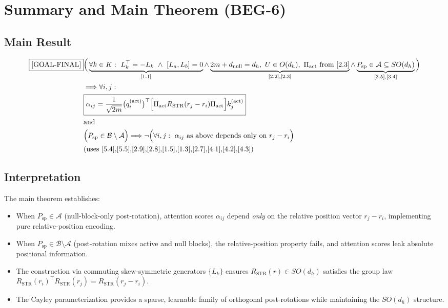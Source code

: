 \documentclass[11pt]{article}
\begin{document}
\section{Summary and Main Theorem (BEG-6)}

\subsection{Main Result}

\begin{align}
\boxed{\text{[GOAL-FINAL]}}
&\Big(
\underbrace{
\forall k\in K:\ L_k^\top=-L_k\ \wedge\ [L_a,L_b]=0
}_{[1.1]}
\wedge
\underbrace{
2m+d_{\mathrm{null}}=d_h,\ U\in O(d_h),\ \Pi_{\mathrm{act}}\text{ from [2.3]}
}_{[2.2],[2.3]}
\wedge
\underbrace{
P_{\mathrm{sp}}\in\mathcal{A}\subseteq SO(d_h)
}_{[3.5],[3.4]}
\Big) \notag\\
&\Longrightarrow
\forall i,j:\ \notag\\
&\boxed{
\alpha_{ij}
=
\frac{1}{\sqrt{2m}}

\big(
q_i^{(\mathrm{act})}
\big)^\top
\Big[
\Pi_{\mathrm{act}}
R_{\mathrm{STR}}(r_j-r_i)
\Pi_{\mathrm{act}}
\Big]
k_j^{(\mathrm{act})}
} \notag\\
&\text{and} \notag\\
&\Big(
P_{\mathrm{sp}}\in\mathcal{B}\setminus\mathcal{A}
\Big)
\Longrightarrow
\neg\Big(
\forall i,j:\ \alpha_{ij}\ \text{as above depends only on }r_j-r_i
\Big) \notag\\
&\text{(uses [5.4],[5.5],[2.9],[2.8],[1.5],[1.3],[2.7],[4.1],[4.2],[4.3])}
\end{align}

\subsection{Interpretation}

The main theorem establishes:

\begin{itemize}
\item When $P_{\mathrm{sp}} \in \mathcal{A}$ (null-block-only post-rotation), attention scores $\alpha_{ij}$ depend \emph{only} on the relative position vector $r_j - r_i$, implementing pure relative-position encoding.

\item When $P_{\mathrm{sp}} \in \mathcal{B} \setminus \mathcal{A}$ (post-rotation mixes active and null blocks), the relative-position property fails, and attention scores leak absolute positional information.

\item The construction via commuting skew-symmetric generators $\{L_k\}$ ensures $R_{\mathrm{STR}}(r) \in SO(d_h)$ satisfies the group law $R_{\mathrm{STR}}(r_i)^\top R_{\mathrm{STR}}(r_j) = R_{\mathrm{STR}}(r_j - r_i)$.

\item The Cayley parameterization provides a sparse, learnable family of orthogonal post-rotations while maintaining the $SO(d_h)$ structure.
\end{itemize}
\end{document}
